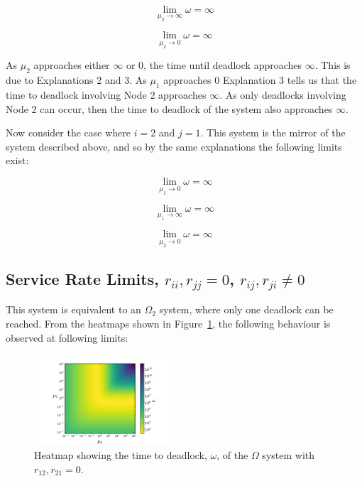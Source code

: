 \documentclass{article}
\begin{document}
\begin{equation}\label{eqn:r21r22__inf}
\lim_{\mu_2 \to \infty} \omega = \infty
\end{equation}

\begin{equation}\label{eqn:r21rr22__0}
\lim_{\mu_2 \to 0} \omega = \infty
\end{equation}

As $\mu_2$ approaches either $\infty$ or $0$, the time until deadlock approaches $\infty$. This is due to Explanations 2 and 3.
As $\mu_1$ approaches $0$ Explanation 3 tells us that the time to deadlock involving Node 2 approaches $\infty$. As only deadlocks involving Node 2 can occur, then the time to deadlock of the system also approaches $\infty$.


Now consider the case where $i = 2$ and $j = 1$.
This system is the mirror of the system described above, and so by the same explanations the following limits exist:

\begin{equation}\label{eqn:r21r22_0_}
\lim_{\mu_1 \to 0} \omega = \infty
\end{equation}

\begin{equation}\label{eqn:r21r22__inf}
\lim_{\mu_1 \to \infty} \omega = \infty
\end{equation}

\begin{equation}\label{eqn:r21rr22__0}
\lim_{\mu_2 \to 0} \omega = \infty
\end{equation}


\subsection{Service Rate Limits, $r_{ii}, r_{jj} = 0$, $r_{ij}, r_{ji} \neq 0$}\label{sec:rijrji}

This system is equivalent to an $\Omega_2$ system, where only one deadlock can be reached.
From the heatmaps shown in Figure~\ref{fig:rijrji}, the following behaviour is observed at following limits:

\begin{figure}[htbp!]
	\begin{center}
		\includegraphics[width=0.45\textwidth]{images/r12r21.pdf}
	\end{center}
	\caption{Heatmap showing the time to deadlock, $\omega$, of the $\Omega$ system with $r_{12}, r_{21} = 0$.}
	\label{fig:rijrji}
\end{figure}
\end{document}
